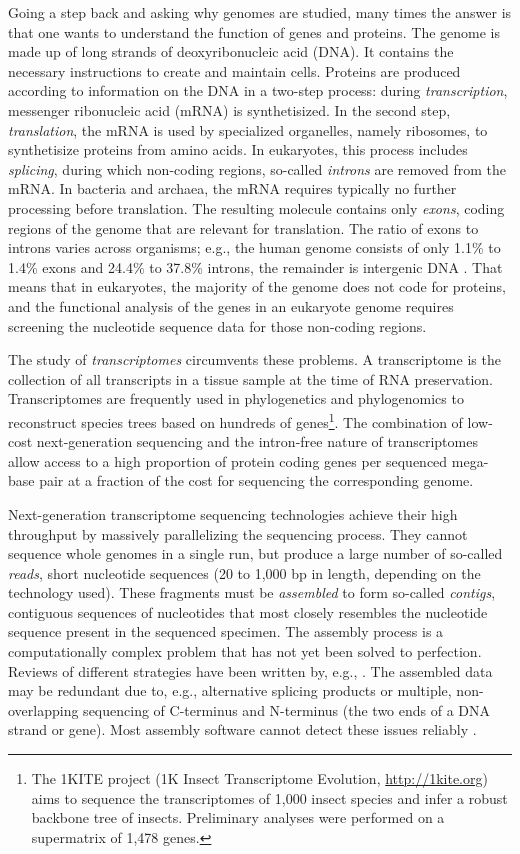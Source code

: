 Going a step back and asking why genomes are studied, many times the answer is
that one wants to understand the function of genes and proteins. The genome is
made up of long strands of deoxyribonucleic acid (DNA). It contains the
necessary instructions to create and maintain cells.  Proteins are produced
according to information on the DNA in a two-step process: during
\emph{transcription}, messenger ribonucleic acid (mRNA) is synthetisized. In the
second step, \emph{translation}, the mRNA is used by specialized organelles,
namely ribosomes, to synthetisize proteins from amino acids. In eukaryotes, this
process includes \emph{splicing}, during which non-coding regions, so-called
\emph{introns} are removed from the mRNA. In bacteria and archaea, the mRNA
requires typically no further processing before translation. The resulting
molecule contains only \emph{exons}, coding regions of the genome that are
relevant for translation. The ratio of exons to introns varies across organisms;
e.g., the human genome consists of only 1.1\% to 1.4\% exons and 24.4\% to
37.8\% introns, the remainder is intergenic DNA \citep{venter2001}. That means
that in eukaryotes, the majority of the genome does not code for proteins, and
the functional analysis of the genes in an eukaryote genome requires screening
the nucleotide sequence data for those non-coding regions.

The study of \emph{transcriptomes} circumvents these problems. A transcriptome
is the collection of all transcripts in a tissue sample at the time of RNA
preservation.  Transcriptomes are frequently used in phylogenetics and
phylogenomics to reconstruct species trees based on hundreds of
genes\footnote{The 1KITE project (1K Insect Transcriptome Evolution,
\url{http://1kite.org}) aims to sequence the transcriptomes of 1,000 insect
species and infer a robust backbone tree of insects. Preliminary analyses were
performed on a supermatrix of 1,478 genes.}.  The combination of low-cost
next-generation sequencing and the intron-free nature of transcriptomes allow
access to a high proportion of protein coding genes per sequenced mega-base pair
at a fraction of the cost for sequencing the corresponding genome.

Next-generation transcriptome sequencing technologies achieve their high
throughput by massively parallelizing the sequencing process. They cannot
sequence whole genomes in a single run, but produce a large number of so-called
\emph{reads}, short nucleotide sequences (20 to 1,000 bp in length, depending on
the technology used). These fragments must be \emph{assembled} to form so-called
\emph{contigs}, contiguous sequences of nucleotides that most closely resembles
the nucleotide sequence present in the sequenced specimen. The assembly process
is a computationally complex problem that has not yet been solved to
perfection. Reviews of different strategies have been written by, e.g.,
\citet{zhang2011}. The assembled data may be redundant due to, e.g.,
alternative splicing products \citep{black2003} or multiple, non-overlapping
sequencing of C-terminus and N-terminus (the two ends of a DNA strand or gene).
Most assembly software cannot detect these issues reliably
\citep{haiminen2011}. 

